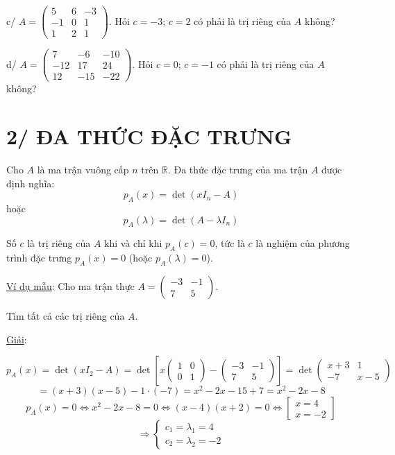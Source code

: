 \documentclass[12pt,a4paper]{article}
\newcommand{\R}{\mathbb{R}}
\begin{document}
c/ $A=\begin{pmatrix}5 & 6 & -3\\ -1 & 0 & 1\\ 1 & 2 & 1\end{pmatrix}$. Hỏi $c=-3$; $c=2$ có phải là trị riêng của $A$ không?

d/ $A=\begin{pmatrix}7 & -6 & -10\\ -12 & 17 & 24\\ 12 & -15 & -22\end{pmatrix}$. Hỏi $c=0$; $c=-1$ có phải là trị riêng của $A$ không?

\newpage
\section*{2/ ĐA THỨC ĐẶC TRƯNG}

Cho $A$ là ma trận vuông cấp $n$ trên $\R$. Đa thức đặc trưng của ma trận $A$ được định nghĩa:
\[
p_A(x)=\det(xI_n-A)
\]
hoặc
\[
p_A(\lambda)=\det(A-\lambda I_n)
\]

Số $c$ là trị riêng của $A$ khi và chỉ khi $p_A(c)=0$, tức là $c$ là nghiệm của phương trình đặc trưng $p_A(x)=0$ (hoặc $p_A(\lambda)=0$).

\medskip
\noindent\underline{Ví dụ mẫu}: Cho ma trận thực $A=\begin{pmatrix}-3 & -1\\ 7 & 5\end{pmatrix}$.

Tìm tất cả các trị riêng của $A$.

\medskip
\noindent\underline{Giải}:

\[
p_A(x)=\det(xI_2-A)=\det\left[x\begin{pmatrix}1&0\\0&1\end{pmatrix}-\begin{pmatrix}-3&-1\\7&5\end{pmatrix}\right]
=\det\begin{pmatrix}x+3 & 1\\ -7 & x-5\end{pmatrix}
\]
\[
=(x+3)(x-5)-1\cdot(-7)=x^2-2x-15+7=x^2-2x-8
\]
\[
p_A(x)=0\Leftrightarrow x^2-2x-8=0\Leftrightarrow (x-4)(x+2)=0\Leftrightarrow
\begin{bmatrix}x=4\\ x=-2\end{bmatrix}
\]
\[
\Rightarrow \begin{cases}c_1=\lambda_1=4\\ c_2=\lambda_2=-2\end{cases}
\]
\end{document}
